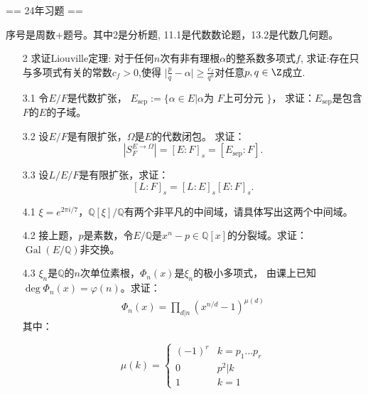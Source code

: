 \newcommand{\Q}{\mathbb{Q}}
\newcommand{\C}{\mathbb{C}}
\newcommand{\id}{\operatorname{id}}
\newcommand{\char}{\operatorname{char}}
\newcommand{\Aut}{\operatorname{Aut}}
\newcommand{\Gal}{\operatorname{Gal}}

== 24年习题 ==

\qquad\quad 序号是周数+题号。其中2是分析题, 11.1是代数数论题，13.2是代数几何题。
\begin{itemize}
    \item[2]
    求证Liouville定理:
    对于任何$n$次有非有理根$\alpha$的整系数多项式$f$,
    求证:存在只与多项式有关的常数$c_f>0$,使得
    $\big|\frac{p}{q} - \alpha\big| \geq \frac{c_f}{q^n}$对任意$p,q\in \Z$成立.

    \item[3.1]
    令$E/F$是代数扩张，
    $E_{\text{sep}} := \{\alpha \in E | \alpha $为
    $ F $上可分元
    $\} $，
    求证：$E_{\text{sep}}$是包含$F$的$E$的子域。

    \item[3.2]
    设$E/F$是有限扩张，$\Omega$是$E$的代数闭包。
    求证：\[ \left|S_F^{E \to \Omega}\right|=[E:F]_s=[E_{\text{sep}}:F]. \]

    \item[3.3]
    设$L/E/F$是有限扩张，求证：\[ [L:F]_s = [L:E]_s[E:F]_s. \]

    \item[4.1]
    $\xi=e^{2\pi i/7}$，$\Q[\xi]/\Q$有两个非平凡的中间域，请具体写出这两个中间域。

    \item[4.2]
    接上题，$p$是素数，令$E/\Q$是$x^n-p \in \Q[x]$的分裂域。求证：$\Gal(E/\Q)$非交换。

    \item[4.3]
    $\xi_n$是$\Q$的$n$次单位素根，$\Phi_n(x)$是$\xi_n$的极小多项式，
    由课上已知$\deg \Phi_n(x)=\varphi(n)$。求证：
     \begin{align*}
     	\Phi_n(x)=\prod_{d|n}^{}(x^{n/d}-1)^{\mu(d)}
     \end{align*}
     其中：
     \begin{center}
     	$$\mu(k)=
     	\left\{
     	\begin{array}{cc}
     		(-1)^r & k=p_1\ldots p_r \\
     		0 & p^2|k \\
     		1 & k=1
     	\end{array}
     	\right.
     	$$
     \end{center}


\end{itemize}
